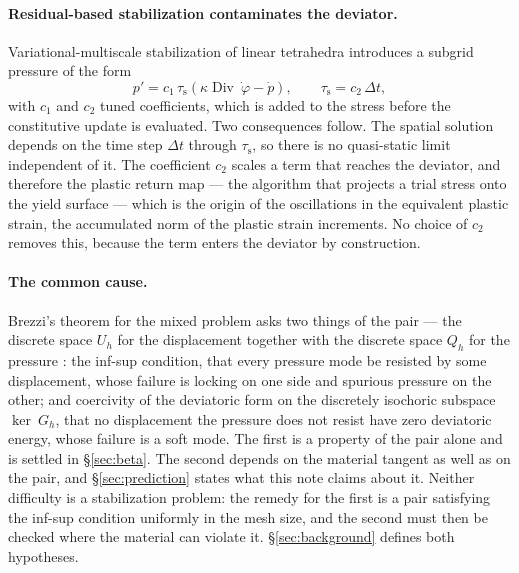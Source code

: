 \documentclass[11pt]{article}
\newcommand{\disp}{~\varphi}
\newcommand{\Div}{\operatorname{Div}}
\theoremstyle{definition}
\theoremstyle{plain}
\begin{document}
\paragraph{Residual-based stabilization contaminates the deviator.}
Variational-multiscale stabilization of linear tetrahedra
\citep{Scovazzi:2015} introduces a subgrid pressure of the form
\begin{equation}
  \label{eq:vms}
  p' = c_1 \, \tau_{\mathrm s} \left( \kappa \Div \dot{\disp} - \dot{p} \right),
  \qquad
  \tau_{\mathrm s} = c_2 \, \Delta t,
\end{equation}
with $c_1$ and $c_2$ tuned coefficients, which is added to the stress before
the constitutive update is evaluated. Two consequences follow. The spatial
solution depends on the time step $\Delta t$ through $\tau_{\mathrm s}$, so
there is no quasi-static limit independent of it. The coefficient $c_2$ scales
a term that reaches the deviator, and therefore the plastic return map --- the
algorithm that projects a trial stress onto the yield surface --- which is the
origin of the oscillations in the equivalent plastic strain, the accumulated
norm of the plastic strain increments. No choice of $c_2$ removes this,
because the term enters the deviator by construction.

\paragraph{The common cause.} Brezzi's theorem for the mixed problem asks two things of
the pair --- the discrete space $U_h$ for the displacement together with the
discrete space $Q_h$ for the pressure
\citep[\S3.4, \S5.2]{BoffiBrezziFortin:2013}: the inf-sup condition,
that every pressure mode be resisted by some displacement, whose failure is
locking on one side and spurious pressure on the other; and coercivity of the
deviatoric form on the discretely isochoric subspace $\ker ~G_h$, that no
displacement the pressure does not resist have zero deviatoric energy, whose
failure is a soft mode.
The first is a property of the pair alone and is settled in \S\ref{sec:beta}.
The second depends on the material tangent as well as on the pair, and
\S\ref{sec:prediction} states what this note claims about it. Neither
difficulty is a stabilization problem: the remedy for the first is a pair
satisfying the inf-sup condition uniformly in the mesh size, and the second
must then be checked where the material can violate it.
\S\ref{sec:background} defines both hypotheses.
\end{document}

